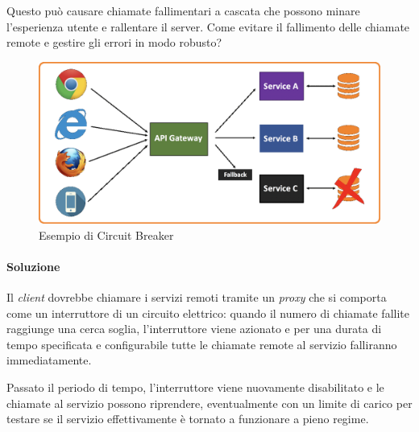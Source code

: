 Questo può causare chiamate fallimentari a cascata che possono minare l'esperienza utente e rallentare il server. Come evitare il fallimento delle chiamate remote e gestire gli errori in modo robusto?

\begin{figure}[H]
	\centering
	\includegraphics[width=\textwidth]{immagini/circuit-breaker.png}
	\caption[Esempio di Circuit Breaker]{Esempio di Circuit Breaker\footnotemark}
\end{figure}

\paragraph*{Soluzione} Il \textit{client} dovrebbe chiamare i servizi remoti tramite un \textit{proxy} che si comporta come un interruttore di un circuito elettrico: quando il numero di chiamate fallite raggiunge una cerca soglia, l'interruttore viene azionato e per una durata di tempo specificata e configurabile tutte le chiamate remote al servizio falliranno immediatamente.

Passato il periodo di tempo, l'interruttore viene nuovamente disabilitato e le chiamate al servizio possono riprendere, eventualmente con un limite di carico per testare se il servizio effettivamente è tornato a funzionare a pieno regime.



